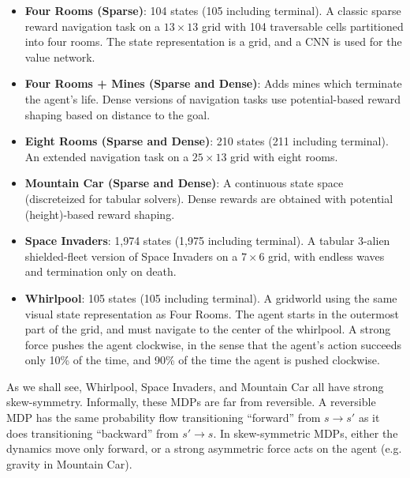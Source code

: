 \documentclass{article}
\theoremstyle{plain}
\theoremstyle{definition}
\theoremstyle{remark}
\begin{document}
\begin{itemize}
  \item \textbf{Four Rooms (Sparse)}: 104 states (105 including terminal). A classic sparse reward navigation task on a $13 \times 13$ grid with 104 traversable cells partitioned into four rooms. The state representation is a grid, and a CNN is used for the value network.
  \item \textbf{Four Rooms + Mines (Sparse and Dense)}: Adds mines which terminate the agent's life. Dense versions of navigation tasks use potential-based reward shaping based on distance to the goal.
  \item \textbf{Eight Rooms (Sparse and Dense)}: 210 states (211 including terminal). An extended navigation task on a $25 \times 13$ grid with eight rooms.
  \item \textbf{Mountain Car (Sparse and Dense)}: A continuous state space (discreteized for tabular solvers). Dense rewards are obtained with potential (height)-based reward shaping.
  \item \textbf{Space Invaders}: 1,974 states (1,975 including terminal). A tabular 3-alien shielded-fleet version of Space Invaders on a $7 \times 6$ grid, with endless waves and termination only on death.
  \item \textbf{Whirlpool}: 105 states (105 including terminal). A gridworld using the same visual state representation as Four Rooms. The agent starts in the outermost part of the grid, and must navigate to the center of the whirlpool. A strong force pushes the agent clockwise, in the sense that the agent's action succeeds only 10\% of the time, and 90\% of the time the agent is pushed clockwise.
\end{itemize}
As we shall see, Whirlpool, Space Invaders, and Mountain Car all have strong skew-symmetry. Informally, these MDPs are far from reversible. A reversible MDP has the same probability flow transitioning ``forward'' from $s \rightarrow s'$ as it does transitioning ``backward'' from $s' \rightarrow s$. In skew-symmetric MDPs, either the dynamics move only forward, or a strong asymmetric force acts on the agent (e.g. gravity in Mountain Car).
\end{document}
